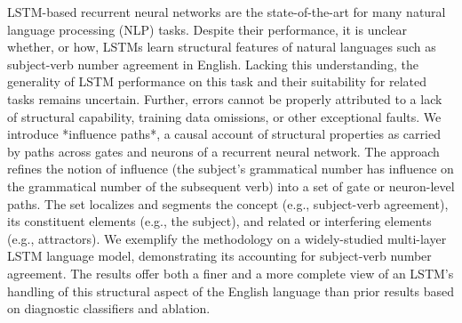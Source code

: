 LSTM-based recurrent neural networks are the state-of-the-art for many natural language processing  (NLP)  tasks. Despite their performance, it is unclear whether, or how, LSTMs learn structural features of natural languages such as subject-verb number agreement in English.   Lacking this understanding,  the generality of  LSTM  performance on this task and their suitability for related tasks remains uncertain.  Further, errors cannot be properly attributed to a lack of structural capability,  training data omissions, or other exceptional faults. We introduce *influence paths*, a causal account of structural properties as carried by paths across gates and neurons of a  recurrent neural network.  The approach refines the notion of influence  (the subject's grammatical number has influence on the grammatical number of the subsequent verb)  into a  set of gate or neuron-level paths.  The set localizes and segments the concept  (e.g.,  subject-verb agreement),  its constituent elements (e.g.,  the subject), and related or interfering elements (e.g., attractors).    We exemplify the methodology on a  widely-studied multi-layer  LSTM  language model, demonstrating its accounting for subject-verb number agreement.   The results offer both a  finer and a  more complete view of an  LSTM's handling of this structural aspect of the English language than prior results based on diagnostic classifiers and ablation.
